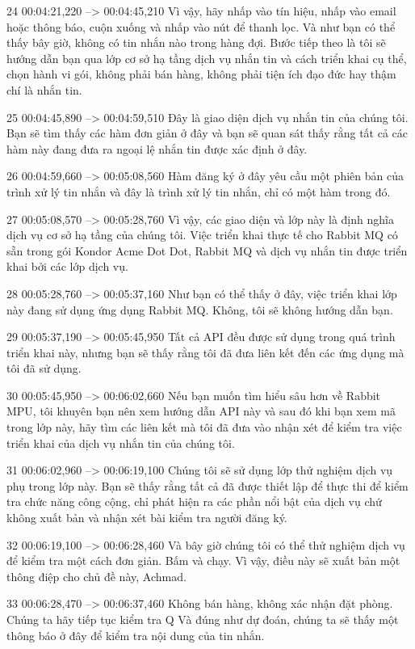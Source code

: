 24
00:04:21,220 --> 00:04:45,210
Vì vậy, hãy nhấp vào tín hiệu, nhấp vào email hoặc thông báo, cuộn xuống và nhấp vào nút để thanh lọc.  Và như bạn có thể thấy bây giờ, không có tin nhắn nào trong hàng đợi. Bước tiếp theo là tôi sẽ hướng dẫn bạn qua lớp cơ sở hạ tầng dịch vụ nhắn tin và cách triển khai cụ thể, chọn hành vi gói, không phải bán hàng, không phải tiện ích đạo đức hay thậm chí là nhắn tin.

25
00:04:45,890 --> 00:04:59,510
Đây là giao diện dịch vụ nhắn tin của chúng tôi.  Bạn sẽ tìm thấy các hàm đơn giản ở đây và bạn sẽ quan sát thấy rằng tất cả các hàm này đang đưa ra ngoại lệ nhắn tin được xác định ở đây.

26
00:04:59,660 --> 00:05:08,560
Hàm đăng ký ở đây yêu cầu một phiên bản của trình xử lý tin nhắn và đây là trình xử lý tin nhắn, chỉ có một hàm trong đó.

27
00:05:08,570 --> 00:05:28,760
Vì vậy, các giao diện và lớp này là định nghĩa dịch vụ cơ sở hạ tầng của chúng tôi.  Việc triển khai thực tế cho Rabbit MQ có sẵn trong gói Kondor Acme Dot Dot, Rabbit MQ và dịch vụ nhắn tin được triển khai bởi các lớp dịch vụ.

28
00:05:28,760 --> 00:05:37,160
Như bạn có thể thấy ở đây, việc triển khai lớp này đang sử dụng ứng dụng Rabbit MQ.  Không, tôi sẽ không hướng dẫn bạn.

29
00:05:37,190 --> 00:05:45,950
Tất cả API đều được sử dụng trong quá trình triển khai này, nhưng bạn sẽ thấy rằng tôi đã đưa liên kết đến các ứng dụng mà tôi đã sử dụng.

30
00:05:45,950 --> 00:06:02,660
Nếu bạn muốn tìm hiểu sâu hơn về Rabbit MPU, tôi khuyên bạn nên xem hướng dẫn API này và sau đó khi bạn xem mã trong lớp này, hãy tìm các liên kết mà tôi đã đưa vào nhận xét để kiểm tra việc triển khai của  dịch vụ nhắn tin của chúng tôi.

31
00:06:02,960 --> 00:06:19,100
Chúng tôi sẽ sử dụng lớp thử nghiệm dịch vụ phụ trong lớp này.  Bạn sẽ thấy rằng tất cả đã được thiết lập để thực thi để kiểm tra chức năng công cộng, chỉ phát hiện ra các phần nổi bật của dịch vụ chứ không xuất bản và nhận xét bài kiểm tra người đăng ký.

32
00:06:19,100 --> 00:06:28,460
Và bây giờ chúng tôi có thể thử nghiệm dịch vụ để kiểm tra một cách đơn giản.  Bấm và chạy.  Vì vậy, điều này sẽ xuất bản một thông điệp cho chủ đề này, Achmad.

33
00:06:28,470 --> 00:06:37,460
Không bán hàng, không xác nhận đặt phòng.  Chúng ta hãy tiếp tục kiểm tra Q Và đúng như dự đoán, chúng ta sẽ thấy một thông báo ở đây để kiểm tra nội dung của tin nhắn.

